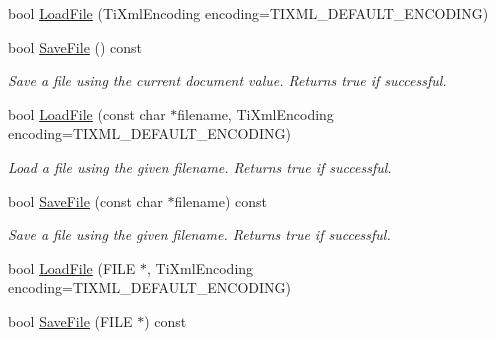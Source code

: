 \begin{DoxyCompactItemize}
\item 
bool \hyperlink{class_ti_xml_document_a4c852a889c02cf251117fd1d9fe1845f}{\-Load\-File} (\-Ti\-Xml\-Encoding encoding=\-T\-I\-X\-M\-L\-\_\-\-D\-E\-F\-A\-U\-L\-T\-\_\-\-E\-N\-C\-O\-D\-I\-N\-G)
\item 
\hypertarget{class_ti_xml_document_a21c0aeb0d0a720169ad4ac89523ebe93}{
bool \hyperlink{class_ti_xml_document_a21c0aeb0d0a720169ad4ac89523ebe93}{\-Save\-File} () const }
\label{class_ti_xml_document_a21c0aeb0d0a720169ad4ac89523ebe93}

\begin{DoxyCompactList}\small\item\em \-Save a file using the current document value. \-Returns true if successful. \end{DoxyCompactList}\item 
\hypertarget{class_ti_xml_document_a879cdf5e981b8b2d2ef82f2546dd28fb}{
bool \hyperlink{class_ti_xml_document_a879cdf5e981b8b2d2ef82f2546dd28fb}{\-Load\-File} (const char $\ast$filename, \-Ti\-Xml\-Encoding encoding=\-T\-I\-X\-M\-L\-\_\-\-D\-E\-F\-A\-U\-L\-T\-\_\-\-E\-N\-C\-O\-D\-I\-N\-G)}
\label{class_ti_xml_document_a879cdf5e981b8b2d2ef82f2546dd28fb}

\begin{DoxyCompactList}\small\item\em \-Load a file using the given filename. \-Returns true if successful. \end{DoxyCompactList}\item 
\hypertarget{class_ti_xml_document_ae869f5ebf7fc54c4a1d737fb4689fd44}{
bool \hyperlink{class_ti_xml_document_ae869f5ebf7fc54c4a1d737fb4689fd44}{\-Save\-File} (const char $\ast$filename) const }
\label{class_ti_xml_document_ae869f5ebf7fc54c4a1d737fb4689fd44}

\begin{DoxyCompactList}\small\item\em \-Save a file using the given filename. \-Returns true if successful. \end{DoxyCompactList}\item 
bool \hyperlink{class_ti_xml_document_a41f6fe7200864d1dca663d230caf8db6}{\-Load\-File} (\-F\-I\-L\-E $\ast$, \-Ti\-Xml\-Encoding encoding=\-T\-I\-X\-M\-L\-\_\-\-D\-E\-F\-A\-U\-L\-T\-\_\-\-E\-N\-C\-O\-D\-I\-N\-G)
\item 
\hypertarget{class_ti_xml_document_acf1672b4538c6d1d441f9f108aea2bf4}{
bool \hyperlink{class_ti_xml_document_acf1672b4538c6d1d441f9f108aea2bf4}{\-Save\-File} (\-F\-I\-L\-E $\ast$) const }
\label{class_ti_xml_document_acf1672b4538c6d1d441f9f108aea2bf4}


\end{DoxyCompactItemize}
